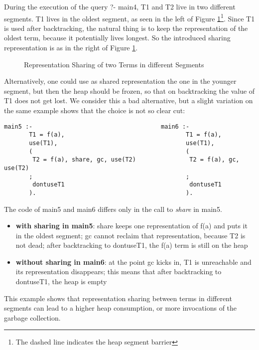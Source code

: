 \documentclass{tlp}
\begin{document}
During the execution of the query ?- main4, T1 and T2 live in two
different segments. T1 lives in the oldest segment, as seen in the
left of Figure \ref{fig2}\footnote{The dashed line indicates the heap
segment barrier}. Since T1 is used after backtracking, the natural
thing is to keep the representation of the oldest term, because it
potentially lives longest. So the introduced sharing representation is
as in the right of Figure \ref{fig2}.
\begin{figure}[h]
\begin{centering}
{}
\caption{Representation Sharing of two Terms in different Segments}
\label{fig2}
\end{centering}
\end{figure}
Alternatively, one could use as shared representation the one in the
younger segment, but then the heap should be frozen, so that on
backtracking the value of T1 does not get lost. We consider this a bad
alternative, but a slight variation on the same example shows that the
choice is not so clear cut:
\begin{Verbatim}[fontsize=\small, frame=single,samepage=true]
main5 :-                                    main6 :-
       T1 = f(a),                                  T1 = f(a),
       use(T1),                                    use(T1),
       (                                           (
        T2 = f(a), share, gc, use(T2)               T2 = f(a), gc, use(T2)
       ;                                           ;
        dontuseT1                                   dontuseT1
       ).                                          ).
\end{Verbatim}
The code of main5 and main6 differs only in the call to {\em share} in
main5.

\begin{itemize}
\item {\bf with sharing in main5}: share keeps one representation of
f(a) and puts it in the oldest segment; gc cannot reclaim that
representation, because T2 is not dead; after backtracking to
dontuseT1, the f(a) term is still on the heap
\item {\bf without sharing in main6}: at the point gc kicks in, T1 is
unreachable and its representation disappears; this means that after
backtracking to dontuseT1, the heap is empty
\end{itemize}

This example shows that representation sharing between terms in
different segments can lead to a higher heap consumption, or more
invocations of the garbage collection.
\end{document}

